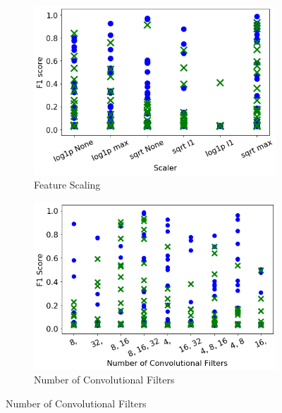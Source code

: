 \begin{figure} \ContinuedFloat
    \centering
    
    \begin{subfigure}[t]{0.49\textwidth}
        \centering
        \includegraphics[width=\textwidth]{images/cnn_scaler.png}
        \caption{Feature Scaling}
        \label{fig:cnn_scaler}
    \end{subfigure}
    \hfill
    \begin{subfigure}[t]{0.49\textwidth}
        \centering
        \includegraphics[width=\textwidth]{images/cnn_filter_structure.png}
        \caption{Number of Convolutional Filters}
        \label{fig:cnn_filter_structure}
    \end{subfigure}
    

\end{figure}

